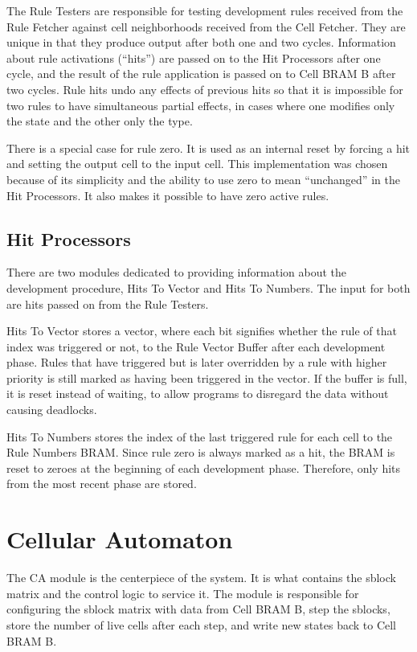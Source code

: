 The Rule Testers are responsible for testing development rules received from the Rule Fetcher against cell neighborhoods received from the Cell Fetcher.
They are unique in that they produce output after both one and two cycles.
Information about rule activations (``hits'') are passed on to the Hit Processors after one cycle, and the result of the rule application is passed on to Cell BRAM B after two cycles.
Rule hits undo any effects of previous hits so that it is impossible for two rules to have simultaneous partial effects, in cases where one modifies only the state and the other only the type.

There is a special case for rule zero.
It is used as an internal reset by forcing a hit and setting the output cell to the input cell.
This implementation was chosen because of its simplicity and the ability to use zero to mean ``unchanged'' in the Hit Processors.
It also makes it possible to have zero active rules.

\subsection{Hit Processors}

There are two modules dedicated to providing information about the development procedure, Hits To Vector and Hits To Numbers.
The input for both are hits passed on from the Rule Testers.

Hits To Vector stores a vector, where each bit signifies whether the rule of that index was triggered or not, to the Rule Vector Buffer after each development phase.
Rules that have triggered but is later overridden by a rule with higher priority is still marked as having been triggered in the vector.
If the buffer is full, it is reset instead of waiting, to allow programs to disregard the data without causing deadlocks.

Hits To Numbers stores the index of the last triggered rule for each cell to the Rule Numbers BRAM.
Since rule zero is always marked as a hit, the BRAM is reset to zeroes at the beginning of each development phase.
Therefore, only hits from the most recent phase are stored.


\section{Cellular Automaton}

The CA module is the centerpiece of the system.
It is what contains the sblock matrix and the control logic to service it.
The module is responsible for configuring the sblock matrix with data from Cell BRAM B, step the sblocks, store the number of live cells after each step, and write new states back to Cell BRAM B.

